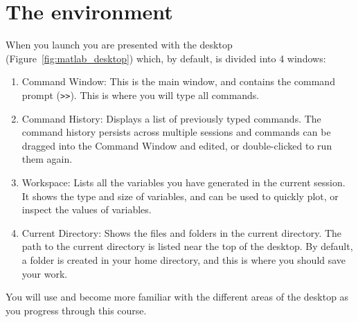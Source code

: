 \section{The \mlab environment}
When you launch \mlab you are presented with the \mlab desktop (Figure~\ref{fig:matlab_desktop}) which, by default, is divided into 4 windows:
\begin{enumerate}
\item Command Window: This is the main window, and contains the command prompt (\texttt{>>}). This is where you will type all commands.
\item Command History: Displays a list of previously typed commands. The command history persists across multiple sessions and commands can be dragged into the Command Window and edited, or double-clicked to run them again.
\item Workspace: Lists all the variables you have generated in the current session. It shows the type and size of variables, and can be used to quickly plot, or inspect the values of variables.
\item Current Directory: Shows the files and folders in the current directory. The path to the current directory is listed near the top of the \mlab desktop. By default, a \mlab folder is created in your home directory, and this is where you should save your work.
\end{enumerate}
You will use and become more familiar with the different areas of the \mlab desktop as you progress through this course. \\

